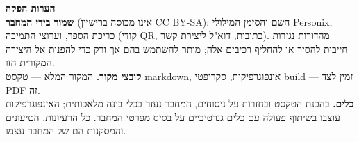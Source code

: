 \clearpage
\thispagestyle{empty}
\begin{flushleft}\small\sffamily
\textbf{הערות הפקה}\\[1.2em]

\textbf{שמור בידי המחבר} (אינו מכוסה ברישיון CC BY-SA): השם
והסימן המילולי Personix, כריכת הספר, וערוצי התמיכה (קודי
QR, כתובות, דוא"ל ליצירת קשר). מהדורות נגזרות חייבות להסיר או להחליף
רכיבים אלה; מותר להשתמש בהם אך ורק כדי להפנות אל היצירה המקורית הזו.\\[1.2em]

\textbf{קובצי מקור.} המקור המלא --- טקסט markdown, אינפוגרפיקות,
סקריפטי build --- זמין לצד PDF זה.\\[1.2em]

\textbf{כלים.} בהכנת הטקסט ובחזרות על ניסוחים, המחבר
נעזר בכלי בינה מלאכותית; האינפוגרפיקות עוצבו
בשיתוף פעולה עם כלים גנרטיביים על בסיס מפרטי המחבר.
כל הרעיונות, הטיעונים והמסקנות הם של המחבר עצמו.
\end{flushleft}
\clearpage
